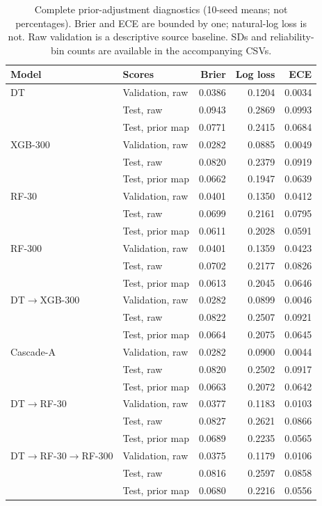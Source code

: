 \begin{table}[!htbp]
\centering
\caption{Complete prior-adjustment diagnostics (10-seed means; not percentages). Brier and ECE are bounded by one; natural-log loss is not. Raw validation is a descriptive source baseline. SDs and reliability-bin counts are available in the accompanying CSVs.}
\label{tab:calibrationfull}
\small
\setlength{\tabcolsep}{4pt}
\begin{tabularx}{\textwidth}{@{}lXrrr@{}}
\toprule
Model & Scores & Brier & Log loss & ECE \\
\midrule
DT & Validation, raw & 0.0386 & 0.1204 & 0.0034 \\
 & Test, raw & 0.0943 & 0.2869 & 0.0993 \\
 & Test, prior map & 0.0771 & 0.2415 & 0.0684 \\
\addlinespace
XGB-300 & Validation, raw & 0.0282 & 0.0885 & 0.0049 \\
 & Test, raw & 0.0820 & 0.2379 & 0.0919 \\
 & Test, prior map & 0.0662 & 0.1947 & 0.0639 \\
\addlinespace
RF-30 & Validation, raw & 0.0401 & 0.1350 & 0.0412 \\
 & Test, raw & 0.0699 & 0.2161 & 0.0795 \\
 & Test, prior map & 0.0611 & 0.2028 & 0.0591 \\
\addlinespace
RF-300 & Validation, raw & 0.0401 & 0.1359 & 0.0423 \\
 & Test, raw & 0.0702 & 0.2177 & 0.0826 \\
 & Test, prior map & 0.0613 & 0.2045 & 0.0646 \\
\addlinespace
DT$\to$XGB-300 & Validation, raw & 0.0282 & 0.0899 & 0.0046 \\
 & Test, raw & 0.0822 & 0.2507 & 0.0921 \\
 & Test, prior map & 0.0664 & 0.2075 & 0.0645 \\
\addlinespace
Cascade-A & Validation, raw & 0.0282 & 0.0900 & 0.0044 \\
 & Test, raw & 0.0820 & 0.2502 & 0.0917 \\
 & Test, prior map & 0.0663 & 0.2072 & 0.0642 \\
\addlinespace
DT$\to$RF-30 & Validation, raw & 0.0377 & 0.1183 & 0.0103 \\
 & Test, raw & 0.0827 & 0.2621 & 0.0866 \\
 & Test, prior map & 0.0689 & 0.2235 & 0.0565 \\
\addlinespace
DT$\to$RF-30$\to$RF-300 & Validation, raw & 0.0375 & 0.1179 & 0.0106 \\
 & Test, raw & 0.0816 & 0.2597 & 0.0858 \\
 & Test, prior map & 0.0680 & 0.2216 & 0.0556 \\
\bottomrule
\end{tabularx}
\end{table}
